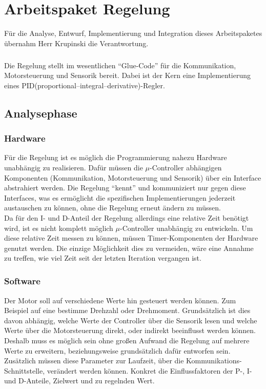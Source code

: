 \graphicspath{{./regulation/}}
\chapter{Arbeitspaket Regelung}
Für die Analyse, Entwurf, Implementierung und Integration dieses Arbeitspaketes übernahm Herr Krupinski die Verantwortung.
\paragraph{}
Die Regelung stellt im wesentlichen ``Glue-Code'' für die Kommunikation, Motorsteuerung und Sensorik bereit. Dabei ist der Kern eine Implementierung eines PID(proportional–integral–derivative)-Regler.
\section{Analysephase}
\subsection{Hardware}
Für die Regelung ist es möglich die Programmierung nahezu Hardware unabhängig zu realisieren. Dafür müssen die $\mu$-Controller abhängigen Komponenten (Kommunikation, Motorsteuerung und Sensorik) über ein Interface abstrahiert werden. Die Regelung ``kennt'' und kommuniziert nur gegen diese Interfaces, was es ermöglicht die spezifischen Implementierungen jederzeit austauschen zu können, ohne die Regelung erneut ändern zu müssen.\\
Da für den I- und D-Anteil der Regelung allerdings eine relative Zeit benötigt wird, ist es nicht komplett möglich $\mu$-Controller unabhängig zu entwickeln. Um diese relative Zeit messen zu können, müssen Timer-Komponenten der Hardware genutzt werden. Die einzige Möglichkeit dies zu vermeiden, wäre eine Annahme zu treffen, wie viel Zeit seit der letzten Iteration vergangen ist.
\paragraph{}
\subsection{Software}
Der Motor soll auf verschiedene Werte hin gesteuert werden können. Zum Beispiel auf eine bestimme Drehzahl oder Drehmoment. Grundsätzlich ist dies davon abhängig, welche Werte der Controller über die Sensorik lesen und welche Werte über die Motorsteuerung direkt, oder indirekt beeinflusst werden können. Deshalb muss es möglich sein ohne großen Aufwand die Regelung auf mehrere Werte zu erweitern, beziehungsweise grundsätzlich dafür entworfen sein. Zusätzlich müssen diese Parameter zur Laufzeit, über die Kommunikations-Schnittstelle, verändert werden können. Konkret die Einflussfaktoren der P-, I- und D-Anteile, Zielwert und zu regelnden Wert.

